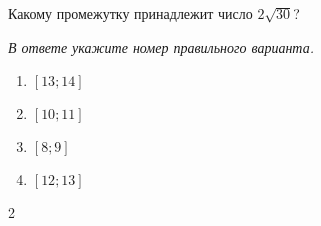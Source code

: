 \begin{ex}
	Какому промежутку принадлежит число $2\sqrt{30}$?
	
	\textit{В ответе укажите номер правильного варианта.}
	\begin{multicols}{4}
		\begin{enumerate}[label=\arabic*)]
			\item $[13;14]$
			\item $[10;11]$
			\item $[8;9]$
			\item $[12;13]$
		\end{enumerate}
	\end{multicols}
	\begin{answer}
		2
	\end{answer}
\end{ex}